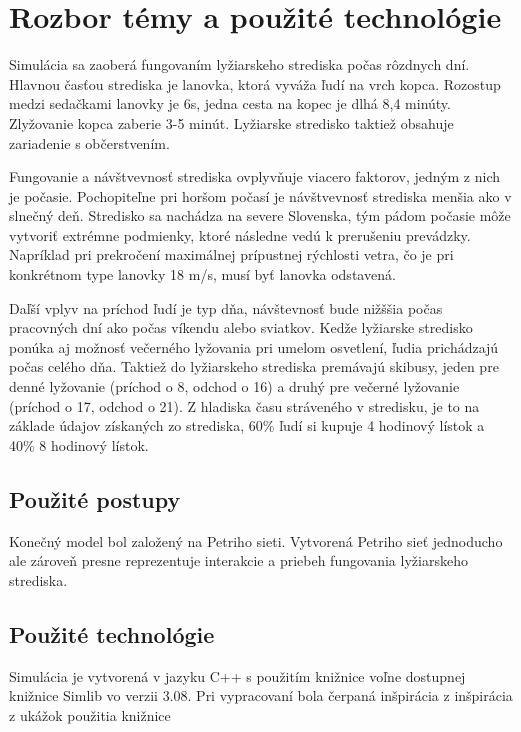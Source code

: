 \section{Rozbor témy a použité technológie} \label{sec:rozbor}
Simulácia sa zaoberá fungovaním lyžiarskeho strediska počas rôzdnych dní. Hlavnou časťou strediska je 
lanovka, ktorá vyváža ľudí na vrch kopca. Rozostup medzi sedačkami lanovky je 6s, jedna cesta na kopec je dlhá 8,4 minúty.
Zlyžovanie kopca zaberie 3-5 minút. 
Lyžiarske stredisko taktiež obsahuje zariadenie s občerstvením.\par
Fungovanie a návštvevnosť strediska ovplyvňuje viacero faktorov, jedným z nich je počasie. Pochopiteľne pri horšom 
počasí je návštvevnosť strediska menšia ako v slnečný deň. Stredisko sa nachádza na severe Slovenska, tým pádom počasie môže vytvoriť
extrémne podmienky, ktoré následne vedú k prerušeniu prevádzky. Napríklad  pri prekročení maximálnej prípustnej rýchlosti vetra,
čo je pri konkrétnom type lanovky 18 m/s, musí byť lanovka odstavená.\par
Daľší vplyv na príchod ľudí je typ dňa, návštevnosť bude nižššia počas pracovných dní ako počas víkendu alebo sviatkov. 
Kedže lyžiarske stredisko ponúka aj možnosť večerného lyžovania pri umelom osvetlení, ľudia prichádzajú počas celého dňa.
Taktiež do lyžiarskeho strediska premávajú skibusy, jeden pre denné lyžovanie (príchod o 8, odchod o 16) a 
druhý pre večerné lyžovanie (príchod o 17, odchod o 21).
Z hladiska času stráveného v stredisku, je to na základe údajov získaných zo strediska, 60\% ľudí si kupuje 4 hodinový lístok a 40\% 8 hodinový lístok. 

\subsection{Použité postupy}
Konečný model bol založený na Petriho sieti. Vytvorená Petriho sieť jednoducho ale zároveň presne reprezentuje interakcie a priebeh fungovania lyžiarskeho strediska.


\subsection{Použité technológie}
Simulácia je vytvorená v jazyku C++ s použitím knižnice voľne dostupnej knižnice Simlib vo verzii 3.08.  Pri vypracovaní bola čerpaná inšpirácia z inšpirácia
z ukážok použitia knižnice\cite{simlib}
